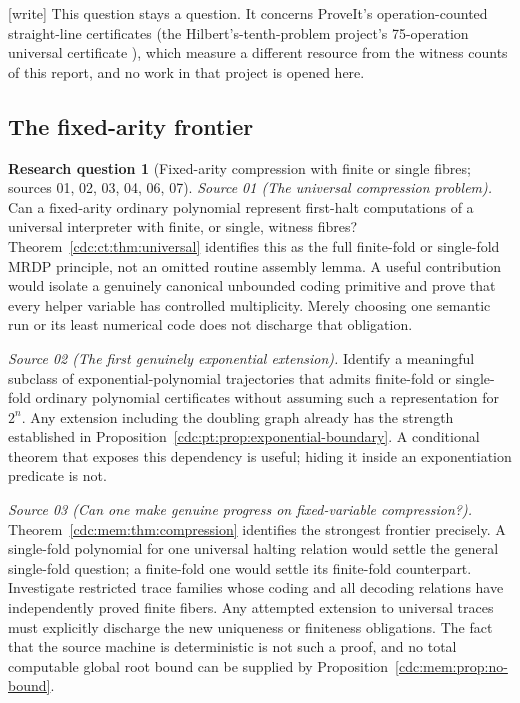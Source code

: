 \documentclass[11pt,a4paper]{article}
\theoremstyle{definition}
\newtheorem{question}[question]{Research question}
\theoremstyle{remark}
\newcommand{\wtag}{\textup{[write]}}%
\begin{document}
\wtag{} This question stays a question. It concerns ProveIt's
operation-counted straight-line certificates (the Hilbert's-tenth-problem
project's 75-operation universal certificate \cite{repo-h10}), which
measure a different resource from the witness counts of this report, and
no work in that project is opened here.

\subsection{The fixed-arity frontier}

\begin{question}[Fixed-arity compression with finite or single fibres; sources 01, 02, 03, 04, 06, 07]\label{cdc:q:compression}
\emph{Source 01 (The universal compression problem).}
Can a fixed-arity ordinary polynomial represent first-halt computations of a universal interpreter with finite, or single, witness fibres? Theorem~\ref{cdc:ct:thm:universal} identifies this as the full finite-fold or single-fold MRDP principle, not an omitted routine assembly lemma. A useful contribution would isolate a genuinely canonical unbounded coding primitive and prove that every helper variable has controlled multiplicity. Merely choosing one semantic run or its least numerical code does not discharge that obligation.

\emph{Source 02 (The first genuinely exponential extension).}
Identify a meaningful subclass of exponential-polynomial trajectories
that admits finite-fold or single-fold ordinary polynomial certificates
without assuming such a representation for $2^n$. Any extension including
the doubling graph already has the strength established in
Proposition~\ref{cdc:pt:prop:exponential-boundary}. A conditional theorem that
exposes this dependency is useful; hiding it inside an exponentiation
predicate is not.

\emph{Source 03 (Can one make genuine progress on fixed-variable compression?).}
Theorem~\ref{cdc:mem:thm:compression} identifies the strongest frontier precisely. A
single-fold polynomial for one universal halting relation would settle the
general single-fold question; a finite-fold one would settle its finite-fold
counterpart. Investigate restricted trace families whose coding and all decoding
relations have independently proved finite fibers. Any attempted extension to
universal traces must explicitly discharge the new uniqueness or finiteness
obligations. The fact that the source machine is deterministic is not such a
proof, and no total computable global root bound can be supplied by
Proposition~\ref{cdc:mem:prop:no-bound}.


\end{question}
\end{document}
